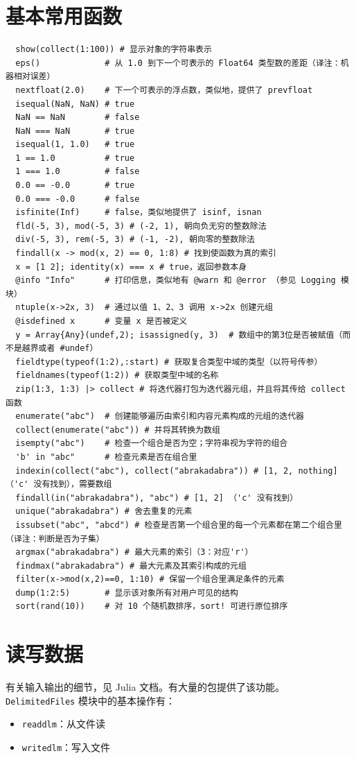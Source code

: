 \documentclass[10pt,a4paper]{article}
\begin{document}
\section{基本常用函数}
\begin{lstlisting}
  show(collect(1:100)) # 显示对象的字符串表示
  eps()             # 从 1.0 到下一个可表示的 Float64 类型数的差距（译注：机器相对误差）
  nextfloat(2.0)    # 下一个可表示的浮点数，类似地，提供了 prevfloat
  isequal(NaN, NaN) # true
  NaN == NaN        # false
  NaN === NaN       # true
  isequal(1, 1.0)   # true
  1 == 1.0          # true
  1 === 1.0         # false
  0.0 == -0.0       # true
  0.0 === -0.0      # false
  isfinite(Inf)     # false，类似地提供了 isinf, isnan
  fld(-5, 3), mod(-5, 3) # (-2, 1), 朝向负无穷的整数除法
  div(-5, 3), rem(-5, 3) # (-1, -2), 朝向零的整数除法
  findall(x -> mod(x, 2) == 0, 1:8) # 找到使函数为真的索引
  x = [1 2]; identity(x) === x # true，返回参数本身
  @info "Info"      # 打印信息，类似地有 @warn 和 @error （参见 Logging 模块）
  ntuple(x->2x, 3)  # 通过以值 1、2、3 调用 x->2x 创建元组
  @isdefined x      # 变量 x 是否被定义
  y = Array{Any}(undef,2); isassigned(y, 3)  # 数组中的第3位是否被赋值（而不是越界或者 #undef）
  fieldtype(typeof(1:2),:start) # 获取复合类型中域的类型（以符号传参）
  fieldnames(typeof(1:2)) # 获取类型中域的名称
  zip(1:3, 1:3) |> collect # 将迭代器打包为迭代器元组，并且将其传给 collect 函数
  enumerate("abc")  # 创建能够遍历由索引和内容元素构成的元组的迭代器
  collect(enumerate("abc")) # 并将其转换为数组
  isempty("abc")    # 检查一个组合是否为空；字符串视为字符的组合
  'b' in "abc"      # 检查元素是否在组合里
  indexin(collect("abc"), collect("abrakadabra")) # [1, 2, nothing] （'c' 没有找到），需要数组
  findall(in("abrakadabra"), "abc") # [1, 2] （'c' 没有找到）
  unique("abrakadabra") # 舍去重复的元素
  issubset("abc", "abcd") # 检查是否第一个组合里的每一个元素都在第二个组合里（译注：判断是否为子集）
  argmax("abrakadabra") # 最大元素的索引（3：对应'r'）
  findmax("abrakadabra") # 最大元素及其索引构成的元组
  filter(x->mod(x,2)==0, 1:10) # 保留一个组合里满足条件的元素
  dump(1:2:5)       # 显示该对象所有对用户可见的结构
  sort(rand(10))    # 对 10 个随机数排序，sort! 可进行原位排序
\end{lstlisting}

\section{读写数据}
有关输入输出的细节，见 Julia 文档。有大量的包提供了该功能。
\lstinline|DelimitedFiles| 模块中的基本操作有：
\begin{itemize}
  \item \lstinline|readdlm|：从文件读
  \item \lstinline|writedlm|：写入文件
\end{itemize}
\end{document}

